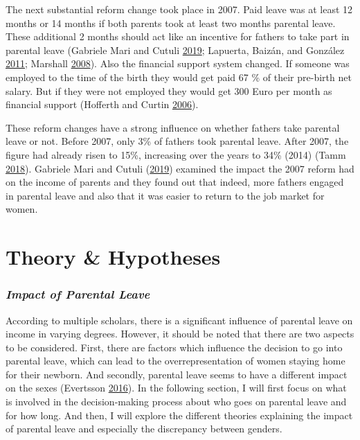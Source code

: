 \documentclass[
  12pt,
]{article}
\begin{document}
The next substantial reform change took place in 2007. Paid leave was at least 12 months or 14 months if both parents took at least two months parental leave. These additional 2 months should act like an incentive for fathers to take part in parental leave (Gabriele Mari and Cutuli \protect\hyperlink{ref-gabriele_mari_parental_2019}{2019}; Lapuerta, Baizán, and González \protect\hyperlink{ref-lapuerta_individual_2011}{2011}; Marshall \protect\hyperlink{ref-marshall_fathers_2008}{2008}). Also the financial support system changed. If someone was employed to the time of the birth they would get paid 67 \% of their pre-birth net salary. But if they were not employed they would get 300 Euro per month as financial support (Hofferth and Curtin \protect\hyperlink{ref-hofferth_parental_2006}{2006}).

These reform changes have a strong influence on whether fathers take parental leave or not. Before 2007, only 3\% of fathers took parental leave. After 2007, the figure had already risen to 15\%, increasing over the years to 34\% (2014) (Tamm \protect\hyperlink{ref-tamm_fathers_2018}{2018}).
Gabriele Mari and Cutuli (\protect\hyperlink{ref-gabriele_mari_parental_2019}{2019}) examined the impact the 2007 reform had on the income of parents and they found out that indeed, more fathers engaged in parental leave and also that it was easier to return to the job market for women.

\hypertarget{theory-hypotheses}{%
\section{Theory \& Hypotheses}\label{theory-hypotheses}}

\hypertarget{impact-of-parental-leave}{%
\subsubsection*{\texorpdfstring{\emph{Impact of Parental Leave}}{Impact of Parental Leave}}\label{impact-of-parental-leave}}

According to multiple scholars, there is a significant influence of parental leave on income in varying degrees.
However, it should be noted that there are two aspects to be considered. First, there are factors which influence the decision to go into parental leave, which can lead to the overrepresentation of women staying home for their newborn. And secondly, parental leave seems to have a different impact on the sexes (Evertsson \protect\hyperlink{ref-evertsson_parental_2016}{2016}). In the following section, I will first focus on what is involved in the decision-making process about who goes on parental leave and for how long. And then, I will explore the different theories explaining the impact of parental leave and especially the discrepancy between genders.
\end{document}
